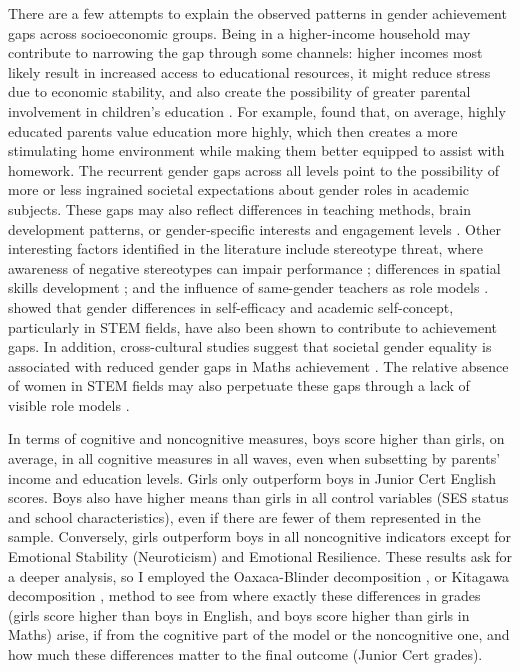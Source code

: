 \documentclass[12pt,a4paper,onecolumn]{article}
\numberwithin{equation}{section}
\begin{document}
There are a few attempts to explain the observed patterns in gender achievement gaps across socioeconomic groups. Being in a higher-income household may contribute to narrowing the gap through some channels: higher incomes most likely result in increased access to educational resources, it might reduce stress due to economic stability, and also create the possibility of greater parental involvement in children's education \parencite{sirin2005}. For example, \textcite{davis2005} found that, on average, highly educated parents value education more highly, which then creates a more stimulating home environment while making them better equipped to assist with homework. The recurrent gender gaps across all levels point to the possibility of more or less ingrained societal expectations about gender roles in academic subjects. These gaps may also reflect differences in teaching methods, brain development patterns, or gender-specific interests and engagement levels \parencite{ceci2009}. Other interesting factors identified in the literature include stereotype threat, where awareness of negative stereotypes can impair performance \parencite{spencer1999}; differences in spatial skills development \parencite{levine2005}; and the influence of same-gender teachers as role models \parencite{beilock2010}. \textcite{huang2013} showed that gender differences in self-efficacy and academic self-concept, particularly in STEM fields, have also been shown to contribute to achievement gaps. In addition, cross-cultural studies suggest that societal gender equality is associated with reduced gender gaps in Maths achievement \parencite{guiso2008}. The relative absence of women in STEM fields may also perpetuate these gaps through a lack of visible role models \parencite{blickenstaff2005}. 

In terms of cognitive and noncognitive measures, boys score higher than girls, on average, in all cognitive measures in all waves, even when subsetting by parents' income and education levels. Girls only outperform boys in Junior Cert English scores. Boys also have higher means than girls in all control variables (SES status and school characteristics), even if there are fewer of them represented in the sample. Conversely, girls outperform boys in all noncognitive indicators except for Emotional Stability (Neuroticism) and Emotional Resilience. These results ask for a deeper analysis, so I employed the Oaxaca-Blinder decomposition \parencite{oaxaca1973,blinder1973}, or Kitagawa decomposition \parencite{kitagawa1955}, method to see from where exactly these differences in grades (girls score higher than boys in English, and boys score higher than girls in Maths) arise, if from the cognitive part of the model or the noncognitive one, and how much these differences matter to the final outcome (Junior Cert grades).
\end{document}
